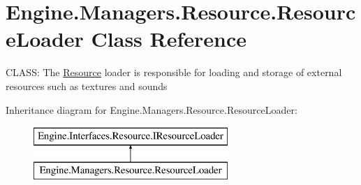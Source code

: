 \hypertarget{a00530}{}\section{Engine.\+Managers.\+Resource.\+Resource\+Loader Class Reference}
\label{a00530}


C\+L\+A\+SS\+: The \hyperlink{a00272}{Resource} loader is responsible for loading and storage of external resources such as textures and sounds  


Inheritance diagram for Engine.\+Managers.\+Resource.\+Resource\+Loader\+:\begin{figure}[H]
\begin{center}
\leavevmode
\includegraphics[height=2.000000cm]{da/d7e/a00530}
\end{center}
\end{figure}
